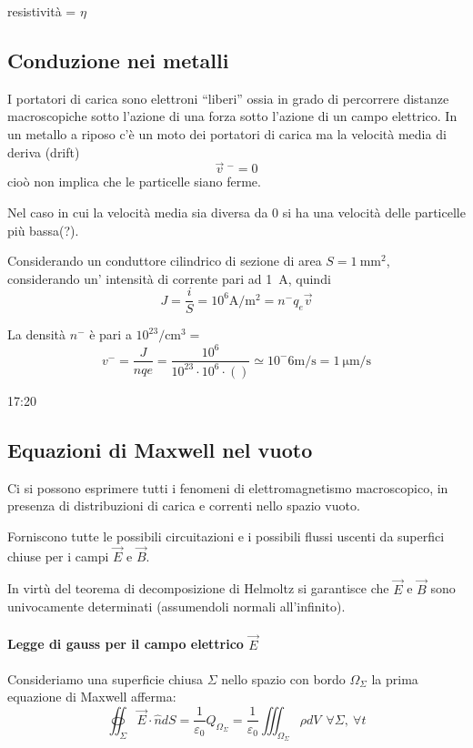 resistività = $\eta$
\subsection{Conduzione nei metalli}
I portatori di carica sono elettroni ``liberi'' ossia in grado di percorrere distanze
macroscopiche sotto l'azione di una forza sotto l'azione di un campo elettrico.
In un metallo a riposo c'è un moto dei portatori di carica ma la velocità media di deriva (drift)
$$
\vec{v}\ ^- = 0
$$
cioò non implica che le particelle siano ferme.

Nel caso in cui la velocità media sia diversa da 0 si ha una velocità delle particelle più bassa(?).

Considerando un conduttore cilindrico di sezione di area $S=\SI{1}{\milli\meter^2}$, considerando un'
intensità di corrente pari ad \SI{1}{\ampere}, quindi
$$
J = \frac{i}{S} = 10^6\si{\ampere\per\meter^2} = n^-q_e\vec{v}
$$

La densità $n^-$ è pari a $10^23/\si{\centi\meter^3} = $
$$
v^- = \frac{J}{nqe} =  \frac{10^6}{10^23\cdot10^6\cdot ()} \simeq 10^-6 \si{\meter\per\second} = \SI{1}{\micro\meter\per\second}
$$

17:20


\subsection{Equazioni di Maxwell nel vuoto}
Ci si possono esprimere tutti i fenomeni di elettromagnetismo macroscopico, in presenza di distribuzioni 
di carica e correnti nello spazio vuoto.

Forniscono tutte le possibili circuitazioni e i possibili flussi uscenti da superfici chiuse per i campi
$\vec{E}$ e $\vec{B}$.

In virtù del teorema di decomposizione di Helmoltz si garantisce che $\vec{E}$ e $\vec{B}$ 
sono univocamente determinati (assumendoli normali all'infinito).

\paragraph{Legge di gauss per il campo elettrico $\vec{E}$}
Consideriamo una superficie chiusa $\Sigma$ nello spazio con bordo $\Omega_\Sigma$
la prima equazione di Maxwell afferma: 
\begin{equation}
\oiint_\Sigma \vec{E}\cdot\hat{n}dS = \frac{1}{\varepsilon_0}Q_{\Omega_\Sigma} = \frac{1}{\varepsilon_0}
\iiint_{\Omega_\Sigma} \rho dV \ \ \forall \Sigma,\ \forall t
\end{equation}

